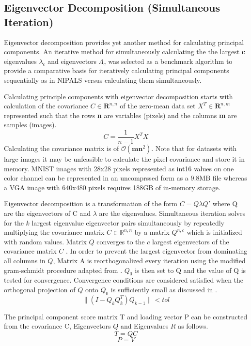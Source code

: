 \documentclass[12pt]{article}
\begin{document}
\subsection{Eigenvector Decomposition (Simultaneous Iteration)}\label{3.3}
Eigenvector decomposition provides yet another method for calculating principal components. An iterative method for simultaneously calculating the the largest \textbf{c} eigenvalues $\lambda_c$ and eigenvectors $\Lambda_c$ was selected as a benchmark algorithm to provide a comparative basis for iteratively calculating principal components sequentially as in NIPALS versus calculating them simultaneously. 

Calculating principle components with eigenvector decomposition starts with calculation of the covariance $C \in \mathbf{R}^{n,n}$ of the zero-mean data set $X^T \in \mathbf{R}^{n,m}$ represented such that the rows \textbf{n} are variables (pixels) and the columns \textbf{m} are samples (images).  
$$C=\frac{1}{n-1}X^TX$$
Calculating the covariance matrix is of $\mathcal{O}(\textbf{mn}^2)$. Note that for datasets with large images it may be unfeasible to calculate the pixel covariance and store it in memory. MNIST images with 28x28 pixels represented as int16 values on one color channel can be represented in an uncomprssed form as a 9.8MB file whereas a VGA image with 640x480 pixels requires 188GB of in-memory storage.      

Eigenvector decomposition is a transformation of the form $C=Q \lambda Q'$ where Q are the eigenvectors of C and $\lambda$ are the eigenvalues. Simultaneous iteration solves for the $k$ largest eigenvalue eigenvector pairs simultaneously by repeatedly multiplying the covariance matrix $C \in \mathbb{R}^{n,n}$ by a matrix $Q^{n,c}$ which is initialized with random values. Matrix $Q$ converges to the $c$ largest eigenvectors of the covariance matrix $C$ \cite{trefethen1997numerical}. In order to prevent the largest eigenvector from dominating all columns in $Q$, Matrix A is reorthogonalized every iteration using the modified gram-schmidt procedure adapted from \cite{srinivasan}. $Q_0$ is then set to Q and the value of Q is tested for convergence. Convergence conditions are considered satisfied when the orthogonal projection of $Q$ onto $Q_0$ is sufficiently small as discussed in \cite{arbenz2012lecture}. 
$$ \|(I-Q_kQ_k^T)Q_{k-1}\|<tol$$

The principal component score matrix T and loading vector P can be constructed from the covariance C,  Eigenvectors $Q$ and Eigenvalues $R$ as follows.
$$T=QC$$
$$P=V$$
\end{document}
